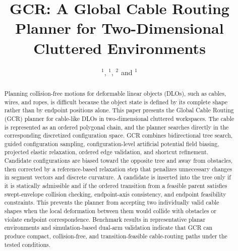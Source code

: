 \documentclass{pas}
\begin{document}



\title{GCR: A Global Cable Routing Planner for Two-Dimensional Cluttered Environments}

\author{ $^{1}$,  $^{1}$,  $^{2}$ and  $^{1}$}







\begin{abstract}
Planning collision-free motions for deformable linear objects (DLOs), such as cables, wires, and ropes, is difficult because the object state is defined by its complete shape rather than by endpoint positions alone. This paper presents the Global Cable Routing (GCR) planner for cable-like DLOs in two-dimensional cluttered workspaces. The cable is represented as an ordered polygonal chain, and the planner searches directly in the corresponding discretized configuration space. GCR combines bidirectional tree search, guided configuration sampling, configuration-level artificial potential field biasing, projected elastic relaxation, ordered edge validation, and shortcut refinement. Candidate configurations are biased toward the opposite tree and away from obstacles, then corrected by a reference-based relaxation step that penalizes unnecessary changes in segment vectors and discrete curvature. A candidate is inserted into the tree only if it is statically admissible and if the ordered transition from a feasible parent satisfies swept-envelope collision checking, endpoint-axis consistency, and endpoint feasibility constraints. This prevents the planner from accepting two individually valid cable shapes when the local deformation between them would collide with obstacles or violate endpoint correspondence. Benchmark results in representative planar environments and simulation-based dual-arm validation indicate that GCR can produce compact, collision-free, and transition-feasible cable-routing paths under the tested conditions.
\end{abstract}
\end{document}
